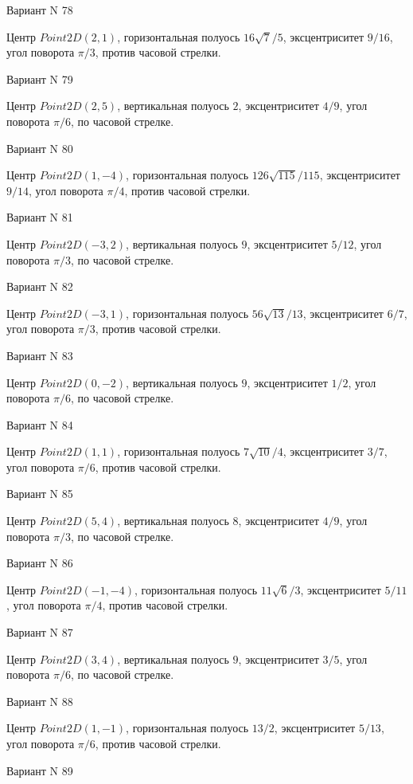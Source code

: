 \documentclass[11pt]{report}
\begin{document}
Вариант N 78

Центр $Point2D\left(2, 1\right)$, горизонтальная полуось $16 \sqrt{7} / 5$, эксцентриситет $9 / 16$, угол поворота $\pi / 3$, против часовой стрелки.

Вариант N 79

Центр $Point2D\left(2, 5\right)$, вертикальная полуось $2$, эксцентриситет $4 / 9$, угол поворота $\pi / 6$, по часовой стрелке.

Вариант N 80

Центр $Point2D\left(1, -4\right)$, горизонтальная полуось $126 \sqrt{115} / 115$, эксцентриситет $9 / 14$, угол поворота $\pi / 4$, против часовой стрелки.

Вариант N 81

Центр $Point2D\left(-3, 2\right)$, вертикальная полуось $9$, эксцентриситет $5 / 12$, угол поворота $\pi / 3$, по часовой стрелке.

Вариант N 82

Центр $Point2D\left(-3, 1\right)$, горизонтальная полуось $56 \sqrt{13} / 13$, эксцентриситет $6 / 7$, угол поворота $\pi / 3$, против часовой стрелки.

Вариант N 83

Центр $Point2D\left(0, -2\right)$, вертикальная полуось $9$, эксцентриситет $1 / 2$, угол поворота $\pi / 6$, по часовой стрелке.

Вариант N 84

Центр $Point2D\left(1, 1\right)$, горизонтальная полуось $7 \sqrt{10} / 4$, эксцентриситет $3 / 7$, угол поворота $\pi / 6$, против часовой стрелки.

Вариант N 85

Центр $Point2D\left(5, 4\right)$, вертикальная полуось $8$, эксцентриситет $4 / 9$, угол поворота $\pi / 3$, по часовой стрелке.

Вариант N 86

Центр $Point2D\left(-1, -4\right)$, горизонтальная полуось $11 \sqrt{6} / 3$, эксцентриситет $5 / 11$, угол поворота $\pi / 4$, против часовой стрелки.

Вариант N 87

Центр $Point2D\left(3, 4\right)$, вертикальная полуось $9$, эксцентриситет $3 / 5$, угол поворота $\pi / 6$, по часовой стрелке.

Вариант N 88

Центр $Point2D\left(1, -1\right)$, горизонтальная полуось $13 / 2$, эксцентриситет $5 / 13$, угол поворота $\pi / 6$, против часовой стрелки.

Вариант N 89
\end{document}
